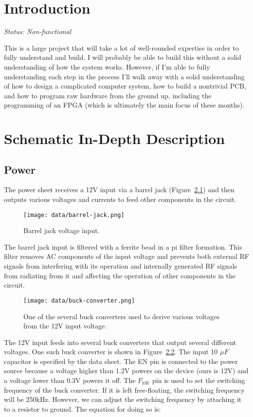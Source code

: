 \documentclass{default}
\begin{document}
\tableofcontents

\chapter{Introduction}
\textit{Status: Non-functional}

This is a large project that will take a lot of well-rounded expertise in order to fully understand
and build. I will probably be able to build this without a solid understanding of how the system
works. However, if I'm able to fully understanding each step in the process I'll walk away with a
solid understanding of how to design a complicated computer system, how to build a nontrivial PCB,
and how to program raw hardware from the ground up, including the programming of an FPGA (which is
ultimately the main focus of these months).

\chapter{Schematic In-Depth Description}

\section{Power}

The power sheet receives a 12V input via a barrel jack (Figure~\ref{fig:barrel-jack}) and then
outputs various voltages and currents to feed other components in the circuit.

\begin{figure}[h]
  \centering
  \texttt{[image: data/barrel-jack.png]}
  \caption{Barrel jack voltage input.}
  \label{fig:barrel-jack}
\end{figure}

The barrel jack input is filtered with a ferrite bead in a pi filter formation. This filter removes
AC components of the input voltage and prevents both external RF signals from interfering with its
operation and internally generated RF signals from radiating from it and affecting the operation of
other components in the circuit.

\begin{figure}[h]
  \centering
  \texttt{[image: data/buck-converter.png]}
  \caption{One of the several buck converters used to derive various voltages from the 12V input
    voltage.}
  \label{fig:buck-converter}
\end{figure}

The 12V input feeds into several buck converters that output several different voltages. One such
buck converter is shown in Figure~\ref{fig:buck-converter}. The input 10 $\mu F$ capacitor is
specified by the data sheet. The EN pin is connected to the power source because a voltage higher
than 1.2V powers on the device (ours is 12V) and a voltage lower than 0.3V powers it off. The
$F_{\text{SW}}$ pin is used to set the switching frequency of the buck converter. If it is left
free-floating, the switching frequency will be 250kHz. However, we can adjust the switching
frequency by attaching it to a resistor to ground. The equation for doing so is:
\end{document}
